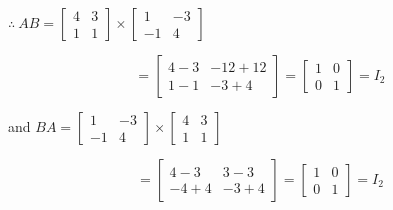 \documentclass{article}
\begin{document}
    \vspace{10pt}
    
    \begin{minipage}{.45\textwidth}
    \(\therefore\ AB = 
    \begin{bmatrix} 4 & 3 \\ 1 & 1 \end{bmatrix}
    \times
    \begin{bmatrix} 1 & -3 \\ -1 & 4 \end{bmatrix}\)
    \end{minipage}

    
    \vspace{10pt}
    
    \begin{minipage}{0.7\textwidth}
    \[ = \begin{bmatrix} 4 - 3 & -12 + 12 \\ 1 - 1 & -3 + 4 \end{bmatrix} = \begin{bmatrix} 1 & 0 \\ 0 & 1 \end{bmatrix} = I_{2} \]
    \end{minipage}
    
    \vspace{10pt}
    
    \begin{minipage}{0.6\textwidth}
    and \( BA = \begin{bmatrix} 1 & -3 \\ -1 & 4 \end{bmatrix} \times \begin{bmatrix} 4 & 3 \\ 1 & 1 \end{bmatrix} \)
    \end{minipage}
    
    \vspace{10pt}

    \begin{minipage}{0.7\textwidth}
        \[ = \begin{bmatrix} 4 - 3 & 3 - 3 \\ -4 + 4 & -3 + 4 \end{bmatrix} = \begin{bmatrix} 1 & 0 \\ 0 & 1 \end{bmatrix} = I_{2} \]
    \end{minipage}
   
\end{document}
